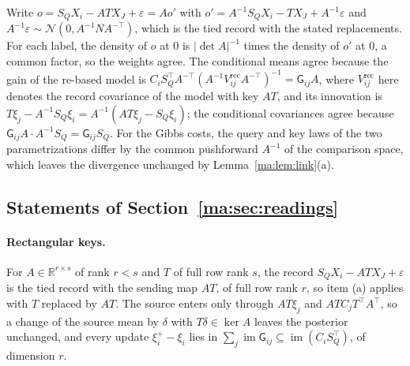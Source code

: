 \documentclass[11pt]{article}
\theoremstyle{definition}
\theoremstyle{remark}
\newcommand{\R}{\mathbb R}
\newcommand{\Gauss}{\mathcal N}
\newcommand{\Vrec}{V^{\mathrm{rec}}}
\newcommand{\G}{\mathsf G}
\newcommand{\im}{\operatorname{im}}
\begin{document}
Write $o=S_QX_i-ATX_J+\varepsilon=Ao'$ with $o'=A^{-1}S_QX_i-TX_J+A^{-1}\varepsilon$ and $A^{-1}\varepsilon\sim\Gauss(0,A^{-1}NA^{-\top})$, which is the tied record with the stated replacements. For each label, the density of $o$ at $0$ is $|\det A|^{-1}$ times the density of $o'$ at $0$, a common factor, so the weights agree. The conditional means agree because the gain of the re-based model is $C_iS_Q^\top A^{-\top}(A^{-1}\Vrec_{ij}A^{-\top})^{-1}=\G_{ij}A$, where $\Vrec_{ij}$ here denotes the record covariance of the model with key $AT$, and its innovation is $T\xi_j-A^{-1}S_Q\xi_i=A^{-1}(AT\xi_j-S_Q\xi_i)$; the conditional covariances agree because $\G_{ij}A\cdot A^{-1}S_Q=\G_{ij}S_Q$. For the Gibbs costs, the query and key laws of the two parametrizations differ by the common pushforward $A^{-1}$ of the comparison space, which leaves the divergence unchanged by Lemma~\ref{ma:lem:link}(a).

\subsection{Statements of Section~\ref{ma:sec:readings}}
\label{ma:app:statements}

\paragraph{Rectangular keys.}
For $A\in\R^{r\times s}$ of rank $r<s$ and $T$ of full row rank $s$, the record $S_QX_i-ATX_J+\varepsilon$ is the tied record with the sending map $AT$, of full row rank $r$, so item (a) applies with $T$ replaced by $AT$. The source enters only through $AT\xi_j$ and $ATC_jT^\top A^\top$, so a change of the source mean by $\delta$ with $T\delta\in\ker A$ leaves the posterior unchanged, and every update $\xi_i^+-\xi_i$ lies in $\sum_j\im\G_{ij}\subseteq\im(C_iS_Q^\top)$, of dimension $r$.
\end{document}
